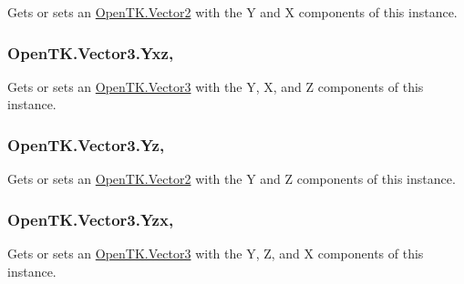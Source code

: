 Gets or sets an \hyperlink{struct_open_t_k_1_1_vector2}{Open\-T\-K.\-Vector2} with the Y and X components of this instance. 

\hypertarget{struct_open_t_k_1_1_vector3_acb33168a5d62a5bf9c238de3004d18e5}{
\subsubsection[{Yxz}]{ Open\-T\-K.\-Vector3.\-Yxz\hspace{0.3cm}{\ttfamily [get]}, {\ttfamily [set]}}}\label{struct_open_t_k_1_1_vector3_acb33168a5d62a5bf9c238de3004d18e5}


Gets or sets an \hyperlink{struct_open_t_k_1_1_vector3}{Open\-T\-K.\-Vector3} with the Y, X, and Z components of this instance. 

\hypertarget{struct_open_t_k_1_1_vector3_a9aa986e42b6d765d154325bf7a81bf84}{
\subsubsection[{Yz}]{ Open\-T\-K.\-Vector3.\-Yz\hspace{0.3cm}{\ttfamily [get]}, {\ttfamily [set]}}}\label{struct_open_t_k_1_1_vector3_a9aa986e42b6d765d154325bf7a81bf84}


Gets or sets an \hyperlink{struct_open_t_k_1_1_vector2}{Open\-T\-K.\-Vector2} with the Y and Z components of this instance. 

\hypertarget{struct_open_t_k_1_1_vector3_a2d64eea73bdec2f85d1e9d3f678e4165}{
\subsubsection[{Yzx}]{ Open\-T\-K.\-Vector3.\-Yzx\hspace{0.3cm}{\ttfamily [get]}, {\ttfamily [set]}}}\label{struct_open_t_k_1_1_vector3_a2d64eea73bdec2f85d1e9d3f678e4165}


Gets or sets an \hyperlink{struct_open_t_k_1_1_vector3}{Open\-T\-K.\-Vector3} with the Y, Z, and X components of this instance. 


